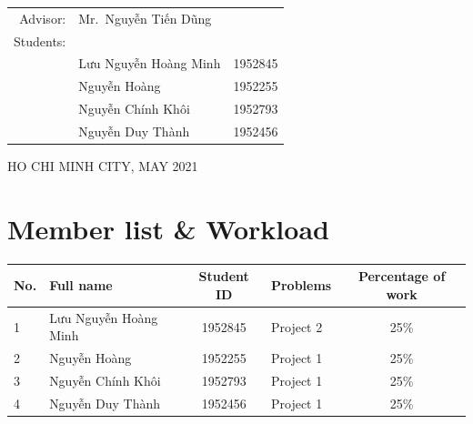 \documentclass[a4paper]{article}
\numberwithin{equation}{section}
\begin{document}
\begin{titlepage}
  \begin{table}[h]
    \begin{tabular}{rll}
      \hspace{1cm} Advisor:  & Mr.\ Nguyễn Tiến Dũng           \\
      \hspace{1cm} Students: &                                 \\
                             & Lưu Nguyễn Hoàng Minh & 1952845 \\
                             & Nguyễn Hoàng          & 1952255 \\
                             & Nguyễn Chính Khôi     & 1952793 \\
                             & Nguyễn Duy Thành      & 1952456 \\
    \end{tabular}
  \end{table}

  \begin{center}
    {\footnotesize HO CHI MINH CITY, MAY 2021}
  \end{center}
\end{titlepage}



\newpage
\tableofcontents
\newpage


\section*{Member list \& Workload}
\begin{center}
  \begin{tabular}{llclc}
    \toprule
    \textbf{No.} & \textbf{Full name}             & \textbf{Student ID} & \textbf{Problems} & \textbf{Percentage of work} \\
    \midrule
    1            & Lưu Nguyễn Hoàng Minh & 1952845             & Project 2         & 25\%                       \\
    2            & Nguyễn Hoàng                   & 1952255             & Project 1         & 25\%                       \\
    3            & Nguyễn Chính Khôi              & 1952793             & Project 1         & 25\%                       \\
    4            & Nguyễn Duy Thành               & 1952456             & Project 1         & 25\%                       \\
    \bottomrule
  \end{tabular}
\end{center}
\end{document}
